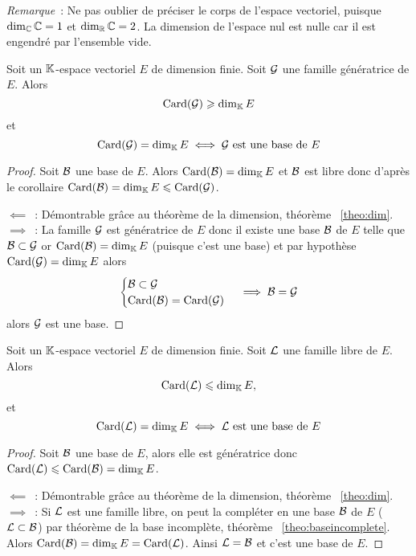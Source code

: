 \emph{Remarque}~: Ne pas oublier de préciser le corps de l'espace vectoriel, puisque \(\operatorname{dim}_{\mathbb{C}} \mathbb{C}=1\) et \(\operatorname{dim}_{\mathbb{R}} \mathbb{C}=2\). La dimension de l'espace nul est nulle car il est engendré par l'ensemble vide.

\begin{theo}
  Soit un \(\mathbb{K}\)-espace vectoriel \(E\) de dimension finie. Soit \(\mathcal{G}\) une famille génératrice de \(E\). Alors
  \begin{equation}
    \operatorname{Card}(\mathcal{G}) \geqslant \operatorname{dim}_{\mathbb{K}} E
  \end{equation}
  et
  \begin{equation}
    \operatorname{Card}(\mathcal{G})=\operatorname{dim}_{\mathbb{K}} E \iff \mathcal{G} \text{~est une base de } E
  \end{equation}
\end{theo}
\begin{proof}
  Soit \(\mathcal{B}\) une base de \(E\). Alors \(\operatorname{Card}(\mathcal{B})=\operatorname{dim}_{\mathbb{K}} E\) et \(\mathcal{B}\) est libre donc d'après le corollaire \(\operatorname{Card}(\mathcal{B}) = \operatorname{dim}_{\mathbb{K}} E \leqslant \operatorname{Card}(\mathcal{G})\).

  \(\impliedby\)~: Démontrable grâce au théorème de la dimension, théorème~
  \ref{theo:dim}.
  \(\implies\)~: La famille \(\mathcal{G}\) est génératrice de \(E\) donc il existe une base \(\mathcal{B}\) de \(E\) telle que \(\mathcal{B} \subset \mathcal{G}\) or \(\operatorname{Card}(\mathcal{B}) = \operatorname{dim}_{\mathbb{K}} E\) (puisque c'est une base) et par hypothèse \(\operatorname{Card}(\mathcal{G}) = \operatorname{dim}_{\mathbb{K}} E\) alors
  \begin{equation}
    \begin{cases} \mathcal{B} \subset \mathcal{G} \\ \operatorname{Card}(\mathcal{B}) = \operatorname{Card}(\mathcal{G}) \end{cases} \implies \mathcal{B}=\mathcal{G}
  \end{equation}
  alors \(\mathcal{G}\) est une base.
\end{proof}

\begin{theo}
  Soit un \(\mathbb{K}\)-espace vectoriel \(E\) de dimension finie. Soit \(\mathcal{L}\) une famille libre de \(E\). Alors
  \begin{equation}
    \operatorname{Card}(\mathcal{L}) \leqslant \operatorname{dim}_{\mathbb{K}} E,
  \end{equation}
  et
  \begin{equation}
    \operatorname{Card}(\mathcal{L})=\operatorname{dim}_{\mathbb{K}} E \iff \mathcal{L} \text{~est une base de } E
  \end{equation}
\end{theo}
\begin{proof}
  Soit \(\mathcal{B}\) une base de \(E\), alors elle est génératrice donc \(\operatorname{Card}(\mathcal{L}) \leqslant \operatorname{Card}(\mathcal{B})=\operatorname{dim}_{\mathbb{K}} E\).

  \(\impliedby\)~: Démontrable grâce au théorème de la dimension, théorème~
  \ref{theo:dim}.  
  \(\implies\)~: Si \(\mathcal{L}\) est une famille libre, on peut la compléter en une base \(\mathcal{B}\) de \(E\) (\(\mathcal{L} \subset \mathcal{B}\)) par théorème de la base incomplète, théorème~
  \ref{theo:baseincomplete}. Alors \(\operatorname{Card}(\mathcal{B})=\operatorname{dim}_{\mathbb{K}} E = \operatorname{Card}(\mathcal{L})\). Ainsi \(\mathcal{L}=\mathcal{B}\) et c'est une base de \(E\).
\end{proof}

